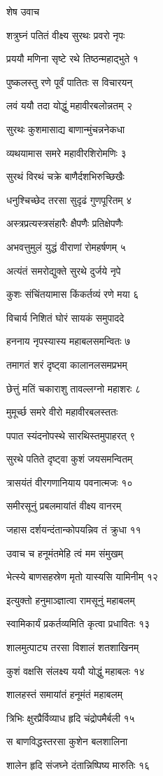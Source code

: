 
शेष उवाच

शत्रुघ्नं पतितं वीक्ष्य सुरथः प्रवरो नृपः

प्रययौ मणिना सृष्टे रथे तिष्ठन्महाद्भुते १

पुष्कलस्तु रणे पूर्वं पातितः स विचारयन्

लवं ययौ तदा योद्धुं महावीरबलोन्नतम् २

सुरथः कुशमासाद्य बाणान्मुंचन्ननेकधा

व्यथयामास समरे महावीरशिरोमणिः ३

सुरथं विरथं चक्रे बाणैर्दशभिरुच्छिखैः

धनुश्चिच्छेद तरसा सुदृढं गुणपूरितम् ४

अस्त्रप्रत्यस्त्रसंहारैः क्षैपणैः प्रतिक्षेपणैः

अभवत्तुमुलं युद्धं वीराणां रोमहर्षणम् ५

अत्यंतं समरोद्युक्ते सुरथे दुर्जये नृपे

कुशः संचिंतयामास किंकर्तव्यं रणे मया ६

विचार्य निशितं घोरं सायकं समुपाददे

हननाय नृपस्यास्य महाबलसमन्वितः ७

तमागतं शरं दृष्ट्वा कालानलसमप्रभम्

छेत्तुं मतिं चकाराशु तावल्लग्नो महाशरः ८

मुमूर्च्छ समरे वीरो महावीरबलस्ततः

पपात स्यंदनोपस्थे सारथिस्तमुपाहरत् ९

सुरथे पतिते दृष्ट्वा कुशं जयसमन्वितम्

त्रासयंतं वीरगणानियाय पवनात्मजः १०

समीरसूनुं प्रबलमायांतं वीक्ष्य वानरम्

जहास दर्शयन्दंतान्कोपयन्निव तं क्रुधा ११

उवाच च हनूमंतमेहि त्वं मम संमुखम्

भेत्स्ये बाणसहस्रेण मृतो यास्यसि यामिनीम् १२

इत्युक्तो हनुमाञ्ज्ञात्वा रामसूनुं महाबलम्

स्वामिकार्यं प्रकर्तव्यमिति कृत्वा प्रधावितः १३

शालमुत्पाट्य तरसा विशालं शतशाखिनम्

कुशं वक्षसि संलक्ष्य ययौ योद्धुं महाबलः १४

शालहस्तं समायांतं हनूमंतं महाबलम्

त्रिभिः क्षुरप्रैर्विव्याध हृदि चंद्रोपमैर्बली १५

स बाणविद्धस्तरसा कुशेन बलशालिना

शालेन हृदि संजघ्ने दंतान्निष्पिष्य मारुतिः १६

